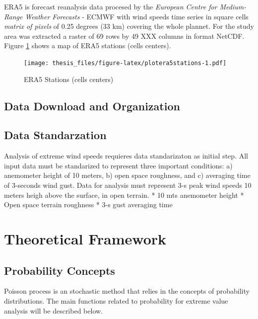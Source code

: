 \documentclass[12pt,twoside]{reedthesis}
\begin{document}
ERA5 is forecast reanalysis data procesed by the \emph{European Centre for Medium-Range Weather Forecasts} - ECMWF with wind speeds time series in square cells \emph{matrix of pixels} of 0.25 degrees (33 km) covering the whole plannet. For the study area was extracted a raster of 69 rows by 49 XXX columns in format NetCDF. Figure \ref{fig:plotera5stations} shows a map of ERA5 stations (cells centers).
\begin{figure}
\centering
\texttt{[image: thesis\_files/figure-latex/plotera5stations-1.pdf]}
\caption{\label{fig:plotera5stations}ERA5 Stations (cells centers)}
\end{figure}
\hypertarget{data-download-and-organization}{%
\section{Data Download and Organization}\label{data-download-and-organization}}

\hypertarget{data-standarzation}{%
\section{Data Standarzation}\label{data-standarzation}}

Analysis of extreme wind speeds requieres data standarizaton as initial step. All input data must be standarized to represent three important conditions: a) anemometer height of 10 meters, b) open space roughness, and c) averaging time of 3-seconds wind gust. Data for analysis must represent 3-s peak wind speeds 10 meters heigh above the surface, in open terrain.
* 10 mts anemometer height
* Open space terrain roughness
* 3-s gust averaging time

\clearpage

\hypertarget{rmd-thefra}{%
\chapter{Theoretical Framework}\label{rmd-thefra}}

\hypertarget{probability-concepts}{%
\section{Probability Concepts}\label{probability-concepts}}

Poisson process is an stochastic method that relies in the concepts of probability distributions. The main functions related to probability for extreme value analysis will be described below.
\end{document}
